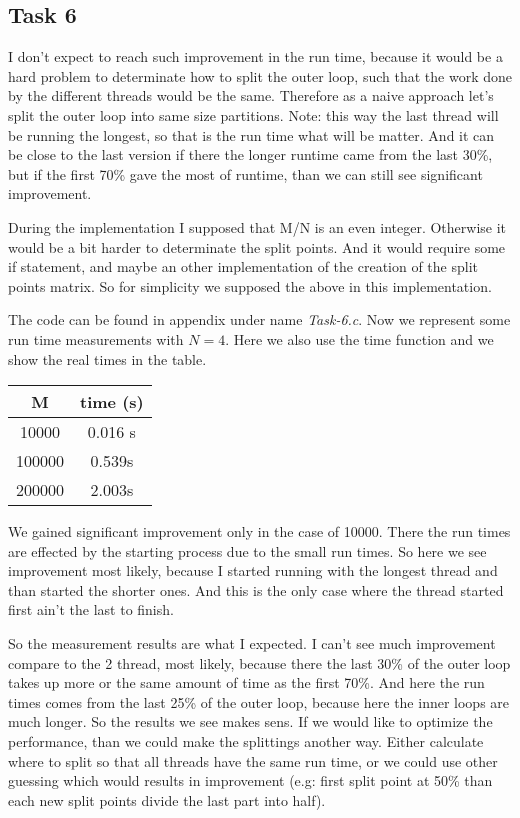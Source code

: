 \subsection*{Task 6}
I don't expect to reach such improvement in the run time, because it would be a hard problem to determinate how to split the outer loop, such that the work done by the different threads would be the same. Therefore as a naive approach let's split the outer loop into same size partitions. Note: this way the last thread will be running the longest, so that is the run time what will be matter. And it can be close to the last version if there the longer runtime came from the last 30\%, but if the first 70\% gave the most of runtime, than we can still see significant improvement. 

During the implementation I supposed that M/N is an even integer. Otherwise it would be a bit harder to determinate the split points. And it would require some if statement, and maybe an other implementation of the creation of the split points matrix. So for simplicity we supposed the above in this implementation.  	

The code can be found in appendix under name \textit{Task-6.c}. Now we represent some run time measurements with $N=4$. Here we also use the time function and we show the real times in the table.

\begin{tabular}{c | c}
M & time (s)\\ \hline
10000 & 0.016 s\\
100000 & 0.539s\\
200000 & 2.003s
\end{tabular}

We gained significant improvement only in the case of 10000. There the run times are effected by the starting process due to the small run times. So here we see improvement most likely, because I started running with the longest thread and than started the shorter ones. And this is the only case where the thread started first ain't the last to finish.

So the measurement results are what I expected. I can't see much improvement compare to the 2 thread, most likely, because there the last 30\% of the outer loop takes up more or the same amount of time as the first 70\%. And here the run times comes from the last 25\% of the outer loop, because here the inner loops are much longer. So the results we see makes sens. If we would like to optimize the performance, than we could make the splittings another way. Either calculate where to split so that all threads have the same run time, or we could use other guessing which would results in improvement (e.g: first split point at 50\% than each new split points divide the last part into half).    

